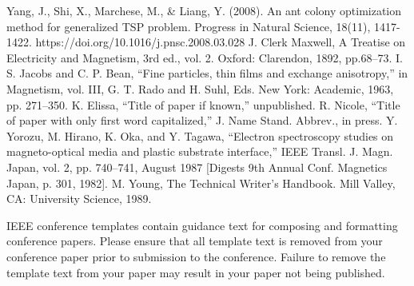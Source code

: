 \documentclass[conference]{IEEEtran}
\begin{document}
\begin{thebibliography}{00}
 Yang, J., Shi, X., Marchese, M., & Liang, Y. (2008). An ant colony optimization method for generalized TSP problem. Progress in Natural Science, 18(11), 1417-1422. https://doi.org/10.1016/j.pnsc.2008.03.028
 J. Clerk Maxwell, A Treatise on Electricity and Magnetism, 3rd ed., vol. 2. Oxford: Clarendon, 1892, pp.68--73.
 I. S. Jacobs and C. P. Bean, ``Fine particles, thin films and exchange anisotropy,'' in Magnetism, vol. III, G. T. Rado and H. Suhl, Eds. New York: Academic, 1963, pp. 271--350.
 K. Elissa, ``Title of paper if known,'' unpublished.
 R. Nicole, ``Title of paper with only first word capitalized,'' J. Name Stand. Abbrev., in press.
 Y. Yorozu, M. Hirano, K. Oka, and Y. Tagawa, ``Electron spectroscopy studies on magneto-optical media and plastic substrate interface,'' IEEE Transl. J. Magn. Japan, vol. 2, pp. 740--741, August 1987 [Digests 9th Annual Conf. Magnetics Japan, p. 301, 1982].
 M. Young, The Technical Writer's Handbook. Mill Valley, CA: University Science, 1989.
\end{thebibliography}
\vspace{12pt}
\color{red}
IEEE conference templates contain guidance text for composing and formatting conference papers. Please ensure that all template text is removed from your conference paper prior to submission to the conference. Failure to remove the template text from your paper may result in your paper not being published.
\end{document}
